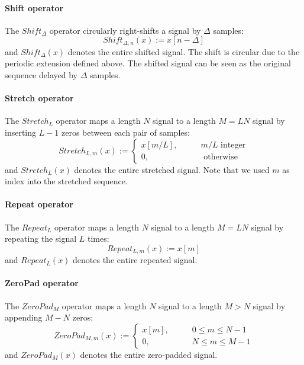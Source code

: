 \paragraph{Shift operator}
The $Shift_{\Delta}$ operator circularly right-shifts a signal by $\Delta$ samples:
\begin{equation}
  Shift_{\Delta,n}(x) := x[n-\Delta]
\end{equation}
and $Shift_{\Delta}(x)$ denotes the entire shifted signal. The shift is circular due to the periodic extension defined above. The shifted signal can be seen as the original sequence delayed by $\Delta$ samples.

\paragraph{Stretch operator}
The $Stretch_L$ operator maps a length $N$ signal to a length $M = LN$ signal by inserting $L-1$ zeros between each pair of samples:
\begin{equation}
  Stretch_{L,m}(x) := 
  \begin{cases}
    x[m/L], \qquad & m/L \text{ integer} \\
    0,      \qquad &     \text{ otherwise}
  \end{cases}
\end{equation}
and $Stretch_L(x)$ denotes the entire stretched signal. Note that we used $m$ as index into the stretched sequence.

\paragraph{Repeat operator}
The $Repeat_L$ operator maps a length $N$ signal to a length $M = LN$ signal by repeating the signal $L$ times:
\begin{equation}
  Repeat_{L,m}(x) := x[m]
\end{equation}  
and $Repeat_L(x)$ denotes the entire repeated signal. 

\paragraph{ZeroPad operator}
The $ZeroPad_M$ operator maps a length $N$ signal to a length $M > N$ signal by appending $M-N$ zeros:
\begin{equation}
  ZeroPad_{M,m}(x) := 
  \begin{cases}
    x[m],   \qquad & 0 \leq m \leq N-1 \\
    0,      \qquad & N \leq m \leq M-1
  \end{cases}
\end{equation}
and $ZeroPad_M(x)$ denotes the entire zero-padded signal.

